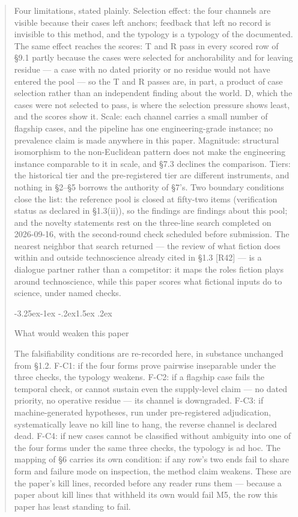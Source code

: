 \documentclass[11pt,a4paper]{article}
\makeatletter
\renewcommand\subsection{\@startsection{subsection}{2}{\z@}%
  {-3.25ex\@plus -1ex \@minus -.2ex}{1.5ex \@plus .2ex}%
  {\normalfont\large\bfseries\raggedright}}
\makeatother
\begin{document}
\begin{abstract}
Four limitations, stated plainly. Selection effect: the four channels are visible because their cases left anchors; feedback that left no record is invisible to this method, and the typology is a typology of the documented. The same effect reaches the scores: T and R pass in every scored row of §9.1 partly because the cases were selected for anchorability and for leaving residue — a case with no dated priority or no residue would not have entered the pool — so the T and R passes are, in part, a product of case selection rather than an independent finding about the world. D, which the cases were not selected to pass, is where the selection pressure shows least, and the scores show it. Scale: each channel carries a small number of flagship cases, and the pipeline has one engineering-grade instance; no prevalence claim is made anywhere in this paper. Magnitude: structural isomorphism to the non-Euclidean pattern does not make the engineering instance comparable to it in scale, and §7.3 declines the comparison. Tiers: the historical tier and the pre-registered tier are different instruments, and nothing in §2–§5 borrows the authority of §7's. Two boundary conditions close the list: the reference pool is closed at fifty-two items (verification status as declared in §1.3(ii)), so the findings are findings about this pool; and the novelty statements rest on the three-line search completed on 2026-09-16, with the second-round check scheduled before submission. The nearest neighbor that search returned — the review of what fiction does within and outside technoscience already cited in §1.3 [R42] — is a dialogue partner rather than a competitor: it maps the roles fiction plays around technoscience, while this paper scores what fictional inputs do to science, under named checks.

\subsection{What would weaken this paper}

The falsifiability conditions are re-recorded here, in substance unchanged from §1.2. F-C1: if the four forms prove pairwise inseparable under the three checks, the typology weakens. F-C2: if a flagship case fails the temporal check, or cannot sustain even the supply-level claim — no dated priority, no operative residue — its channel is downgraded. F-C3: if machine-generated hypotheses, run under pre-registered adjudication, systematically leave no kill line to hang, the reverse channel is declared dead. F-C4: if new cases cannot be classified without ambiguity into one of the four forms under the same three checks, the typology is ad hoc. The mapping of §6 carries its own condition: if any row's two ends fail to share form and failure mode on inspection, the method claim weakens. These are the paper's kill lines, recorded before any reader runs them — because a paper about kill lines that withheld its own would fail M5, the row this paper has least standing to fail.


\end{abstract}
\end{document}
